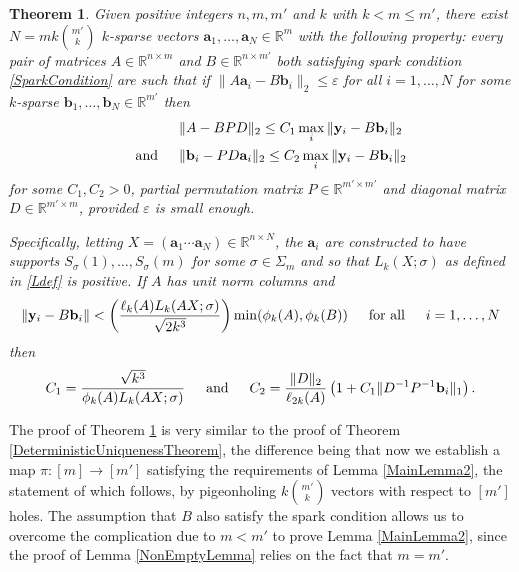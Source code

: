 \documentclass[journal, onecolumn]{IEEEtran}
\newtheorem{theorem}{Theorem}
\begin{document}
\begin{theorem}\label{DeterministicUniquenessTheorem2}
Given positive integers $n, m, m'$ and $k$ with $k < m \leq m'$, there exist $N =  mk{m' \choose k}$ $k$-sparse vectors $\mathbf{a}_1, \ldots, \mathbf{a}_N \in \mathbb{R}^m$ with the following property: every pair of matrices $A \in \mathbb{R}^{n \times m}$ and $B \in \mathbb{R}^{n \times m'}$ both satisfying spark condition \eqref{SparkCondition} are such that if $\| A\mathbf{a}_i - B\mathbf{b}_i \|_2 \leq \varepsilon$ for all $i = 1, \ldots, N$ for some $k$-sparse $\mathbf{b}_1, \ldots, \mathbf{b}_N \in \mathbb{R}^{m'}$ then 
\begin{align}
&\|A - BPD\|_2 \leq C_1 \max_i \|\mathbf{y}_i - B\mathbf{b}_i\|_2 \\
\indent \text{and} \indent
&\|\mathbf{b}_i - PD\mathbf{a}_i\|_2 \leq C_2 \max_i \|\mathbf{y}_i - B\mathbf{b}_i\|_2
\end{align}
%
for some $C_1, C_2 > 0$, partial permutation matrix $P \in \mathbb{R}^{m' \times m'}$ and diagonal matrix $D \in \mathbb{R}^{m' \times m}$, provided $\varepsilon$ is small enough.

Specifically, letting $X  = (\mathbf{a}_1 \cdots \mathbf{a}_N) \in \mathbb{R}^{n \times N}$, the $\mathbf{a}_i$ are constructed to have supports $S_\sigma(1), \ldots, S_\sigma(m)$ for some $\sigma \in \Sigma_m$ and so that $L_k(X;\sigma)$ as defined in \eqref{Ldef} is positive. If $A$ has unit norm columns and
\begin{align*}
\|\mathbf{y}_i - B\mathbf{b}_i\| < \left( \frac{ \ell_{k}(A) L_k(AX;\sigma) }{\sqrt{2k^3} } \right) \min(\phi_k(A), \phi_k(B)) \indent \text{for all} \indent i = 1, \ldots, N
\end{align*}
%
then
\begin{align}
C_1 = \frac{\sqrt{k^3}}{\phi_k(A) L_k(AX;\sigma)} 
\indent \text{and} \indent 
C_2 = \frac{ \|D\|_2}{\ell_{2k}(A)}  \left( 1 + C_1\|D^{-1}P^{-1}\mathbf{b}_i\|_1 \right).
\end{align}
\end{theorem}

The proof of Theorem \ref{DeterministicUniquenessTheorem2} is very similar to the proof of Theorem \ref{DeterministicUniquenessTheorem}, the difference being that now we establish a map $\pi: [m] \to [m']$ satisfying the requirements of Lemma \ref{MainLemma2}, the statement of which follows, by pigeonholing $k{m' \choose k}$ vectors with respect to $[m']$ holes. The assumption that $B$ also satisfy the spark condition allows us to overcome the complication due to $m < m'$ to prove Lemma \ref{MainLemma2}, since the proof of Lemma \ref{NonEmptyLemma} relies on the fact that $m = m'$. 
\end{document}
